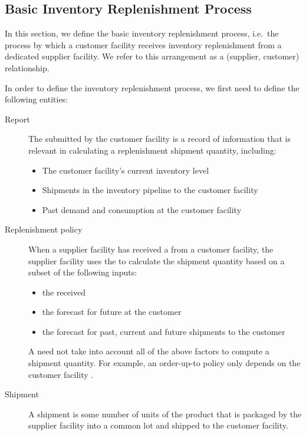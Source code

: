 \subsection{Basic Inventory Replenishment Process}
\label{conceptual-model->inventory-replenishment:generic-(supplier-customer)}

In this section,
we define the basic inventory replenishment process,
i.e.\ the process by which a customer facility
receives inventory replenishment from a dedicated supplier facility.
We refer to this arrangement as a (supplier, customer) relationship.

In order to define the inventory replenishment process,
we first need to define the following entities:
\begin{description}
  \item[Report]
      The  submitted by the customer facility
      is a record of information that is relevant
      in calculating a replenishment shipment quantity, including:
      \begin{itemize}
        \item The customer facility's current inventory level
        \item Shipments in the inventory pipeline to the customer facility
        \item Past demand and consumption at the customer facility
      \end{itemize}
  \item[Replenishment policy]
      When a supplier facility has received a 
      from a customer facility,
      the supplier facility uses the 
      to calculate the shipment quantity
      based on a subset of the following inputs:
      \begin{itemize}
        \item the received 
        \item the forecast for future  at the customer
        \item the  forecast for past, current and future
            shipments to the customer
      \end{itemize}
      A  need not take into account
      all of the above factors to compute a shipment quantity.
      For example, an order-up-to policy
      only depends on the customer facility .
  \item[Shipment]
      A shipment is some number of units of the product
      that is packaged by the supplier facility into a common lot
      and shipped to the customer facility.
\end{description}

